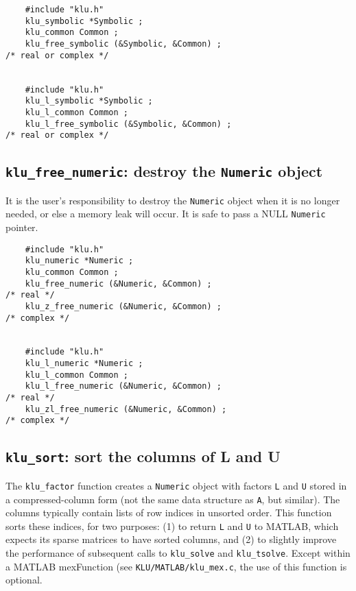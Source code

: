 \documentclass[11pt]{article}
\begin{document}
{\footnotesize
\begin{verbatim}
    #include "klu.h"
    klu_symbolic *Symbolic ;
    klu_common Common ;
    klu_free_symbolic (&Symbolic, &Common) ;                                  /* real or complex */


    #include "klu.h"
    klu_l_symbolic *Symbolic ;
    klu_l_common Common ;
    klu_l_free_symbolic (&Symbolic, &Common) ;                                /* real or complex */
\end{verbatim}
}

\subsection{{\tt klu\_free\_numeric}: destroy the {\tt Numeric} object}

It is the user's responsibility to destroy the {\tt Numeric} object when it is
no longer needed, or else a memory leak will occur.  It is safe to pass a NULL
{\tt Numeric} pointer.

{\footnotesize
\begin{verbatim}
    #include "klu.h"
    klu_numeric *Numeric ;
    klu_common Common ;
    klu_free_numeric (&Numeric, &Common) ;                                            /* real */
    klu_z_free_numeric (&Numeric, &Common) ;                                          /* complex */


    #include "klu.h"
    klu_l_numeric *Numeric ;
    klu_l_common Common ;
    klu_l_free_numeric (&Numeric, &Common) ;                                          /* real */
    klu_zl_free_numeric (&Numeric, &Common) ;                                         /* complex */
\end{verbatim}
}

\subsection{{\tt klu\_sort}: sort the columns of L and U}

The {\tt klu\_factor} function creates a {\tt Numeric} object with factors
{\tt L} and {\tt U} stored in a compressed-column form (not the same data
structure as {\tt A}, but similar).  The columns typically contain lists of
row indices in unsorted order.  This function sorts these indices, for two
purposes:  (1) to return {\tt L} and {\tt U} to MATLAB, which expects its
sparse matrices to have sorted columns, and (2) to slightly improve the
performance of subsequent calls to {\tt klu\_solve} and {\tt klu\_tsolve}.
Except within a MATLAB mexFunction (see {\tt KLU/MATLAB/klu\_mex.c}, the use
of this function is optional.
\end{document}
